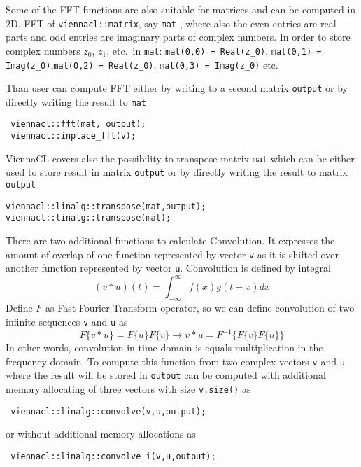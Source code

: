 Some of the FFT functions are also suitable for matrices and can be computed in 2D. FFT of \lstinline|viennacl::matrix|, say  \lstinline|mat| , where also the even entries are real parts and odd entries are imaginary parts of complex numbers. In order to store complex numbers $z_0$, $z_1$, etc.~in \lstinline|mat|: \lstinline|mat(0,0) = Real(z_0)|, \lstinline|mat(0,1) = Imag(z_0)|,\lstinline|mat(0,2) = Real(z_0)|, \lstinline|mat(0,3) = Imag(z_0)| etc.

Than user can compute FFT  either by writing to a second matrix \lstinline|output| or by directly writing the result to \lstinline|mat| 
\begin{lstlisting}
 viennacl::fft(mat, output);
 viennacl::inplace_fft(v);
\end{lstlisting}


ViennaCL covers also the possibility to transpose matrix \lstinline|mat| which can be either used to store result in  matrix \lstinline|output| or by directly writing the result to matrix  \lstinline|output|
\begin{lstlisting}
viennacl::linalg::transpose(mat,output);
viennacl::linalg::transpose(mat);
\end{lstlisting}


There are two additional functions to calculate Convolution. It expresses the amount of overlap of one function represented by vector \lstinline|v| as it is shifted over another function represented by vector \lstinline|u|. Convolution is defined by integral 
$$(v*u)(t) = \int_{-\infty}^\infty f(x)g(t-x) dx$$ Define $F$ as Fast Fourier Transform operator, so we can define convolution of two infinite sequences  \lstinline|v| and  \lstinline|u| as 
$$F\{v*u\} = F\{u\}F\{v\} \rightarrow v*u = F^{-1}\{F\{v\}F\{u\}\}$$
In other words, convolution in time domain is equals  multiplication in the frequency domain. To compute this function from two complex vectors \lstinline|v| and \lstinline|u| where the result will be stored in \lstinline|output| can be computed with additional memory allocating of three vectors with size \lstinline|v.size()| as  
\begin{lstlisting}
 viennacl::linalg::convolve(v,u,output);
\end{lstlisting}
or without additional memory allocations as
\begin{lstlisting}
 viennacl::linalg::convolve_i(v,u,output);
\end{lstlisting}

